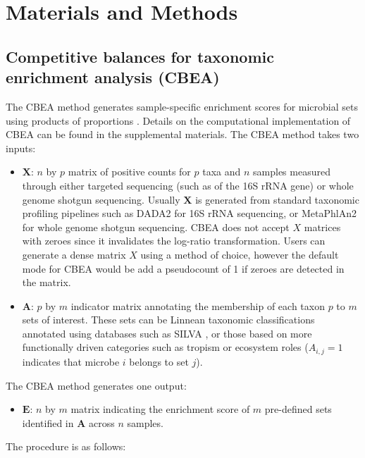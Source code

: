 \documentclass[10pt,letterpaper]{article}
\begin{document}
\section*{Materials and Methods} \label{methods}
\subsection*{Competitive balances for taxonomic enrichment analysis (CBEA)}
The CBEA method generates sample-specific enrichment scores for microbial sets using products of proportions \cite{egozcue2003}. Details on the computational implementation of CBEA can be found in the supplemental materials. The CBEA method takes two inputs:  
\begin{itemize}
    \item $\mathbf{X}$: $n$ by $p$ matrix of positive counts for $p$ taxa and $n$ samples measured through either targeted sequencing (such as of the 16S rRNA gene) or whole genome shotgun sequencing. Usually $\mathbf{X}$ is generated from standard taxonomic profiling pipelines such as DADA2 \cite{callahan2016} for 16S rRNA sequencing, or MetaPhlAn2 \cite{truong2015} for whole genome shotgun sequencing. CBEA does not accept $X$ matrices with zeroes since it invalidates the log-ratio transformation. Users can generate a dense matrix $X$ using a method of choice, however the default mode for CBEA would be add a pseudocount of 1 if zeroes are detected in the matrix. 
    \item $\mathbf{A}$: $p$ by $m$ indicator matrix annotating the membership of each taxon $p$ to $m$ sets of interest. These sets can be Linnean taxonomic classifications annotated using databases such as SILVA \cite{quast2013}, or those based on more functionally driven categories such as tropism or ecosystem roles ($A_{i,j} = 1$ indicates that microbe $i$ belongs to set $j$). 
\end{itemize}
The CBEA method generates one output:  
\begin{itemize} 
    \item $\mathbf{E}$: $n$ by $m$ matrix indicating the enrichment score of $m$ pre-defined sets identified in $\mathbf{A}$ across $n$ samples. 
\end{itemize}
The procedure is as follows:  
\end{document}
